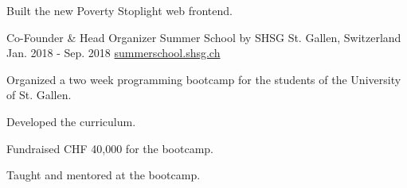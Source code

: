 \begin{cventries}
{\begin{cvitems}
      \item {Built the new Poverty Stoplight web frontend.}
      \end{cvitems}
    }
  \cventry
    {Co-Founder \& Head Organizer} %
    {Summer School by SHSG} %
    {St. Gallen, Switzerland} %
    {Jan. 2018 - Sep. 2018} %
    {\href{https://summerschool.shsg.ch}{summerschool.shsg.ch}} %
    {
      \begin{cvitems} %
      \item {Organized a two week programming bootcamp for the students of the University of St. Gallen.}
      \item {Developed the curriculum.}
      \item {Fundraised CHF 40,000 for the bootcamp.}
      \item {Taught and mentored at the bootcamp.}
      \end{cvitems}
    }


\end{cventries}
